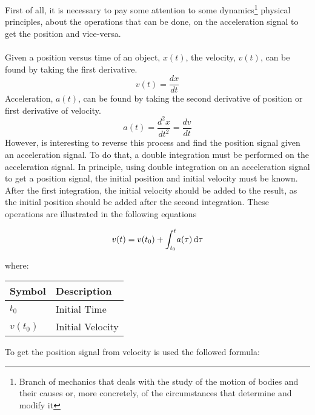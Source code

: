 \documentclass[tesi]{subfiles}
\begin{document}
First of all, it is necessary to pay some attention to some dynamics\footnote{Branch of mechanics that deals with the study of the motion of bodies and their causes or, more concretely, of the circumstances that determine and modify it} physical principles, about the operations that can be done, on the acceleration signal to get the position and vice-versa.\\\\
Given a position versus time of an object, $x(t)$, the velocity, $v(t)$, can be found by taking the first derivative.
\begin{equation}
v(t) = \dfrac{dx}{dt}
\end{equation}\label{eq:velocity}
Acceleration, $a(t)$, can be found by taking the second derivative of position or first
derivative of velocity.
\begin{equation}
a(t) = \dfrac{d^{2}x}{dt^{2}} = \dfrac{dv}{dt}
\end{equation}\label{eq:displacement}
However, is interesting to reverse this process and find the position signal given an acceleration signal. To do that, a double integration must be performed on the acceleration signal.
In principle, using double integration on an acceleration signal to get a position signal, the initial position and initial velocity must be known. After the first integration, the initial velocity should be added to the result, as the initial position should be added after the second integration. These operations are illustrated in the following equations
\begin{center}
\begin{equation}
 {\large v(t) = v(t_{0}) + \int_{t_{0}}^{t} \! a(\tau) \, \mathrm{d}\tau}
\end{equation}

where: 
\begin{table}[ht]
\centering
    \begin{tabular}{ | l | l |}
    
    \hline
    Symbol & Description \\ \hline
   \quad  $t_{0}$ & Initial Time \\ \hline
	   \quad  $v(t_{0})$ & Initial Velocity\\  
\hline 
    \end{tabular}
\end{table}
\end{center}
\clearpage
To get the position signal from velocity is used the followed formula:
\end{document}
